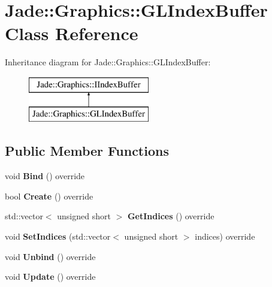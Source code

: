 \hypertarget{class_jade_1_1_graphics_1_1_g_l_index_buffer}{}\section{Jade\+:\+:Graphics\+:\+:G\+L\+Index\+Buffer Class Reference}
\label{class_jade_1_1_graphics_1_1_g_l_index_buffer}
Inheritance diagram for Jade\+:\+:Graphics\+:\+:G\+L\+Index\+Buffer\+:\begin{figure}[H]
\begin{center}
\leavevmode
\includegraphics[height=2.000000cm]{class_jade_1_1_graphics_1_1_g_l_index_buffer}
\end{center}
\end{figure}
\subsection*{Public Member Functions}
\begin{DoxyCompactItemize}
\item 
\hypertarget{class_jade_1_1_graphics_1_1_g_l_index_buffer_ab16051fed0eb89e9ea11920fa0afe8e6}{}void {\bfseries Bind} () override\label{class_jade_1_1_graphics_1_1_g_l_index_buffer_ab16051fed0eb89e9ea11920fa0afe8e6}

\item 
\hypertarget{class_jade_1_1_graphics_1_1_g_l_index_buffer_aeba772fbd44fb45ccb1c8309fc594e94}{}bool {\bfseries Create} () override\label{class_jade_1_1_graphics_1_1_g_l_index_buffer_aeba772fbd44fb45ccb1c8309fc594e94}

\item 
\hypertarget{class_jade_1_1_graphics_1_1_g_l_index_buffer_ab16200869fc966f0d58aa371fc7a2691}{}std\+::vector$<$ unsigned short $>$ {\bfseries Get\+Indices} () override\label{class_jade_1_1_graphics_1_1_g_l_index_buffer_ab16200869fc966f0d58aa371fc7a2691}

\item 
\hypertarget{class_jade_1_1_graphics_1_1_g_l_index_buffer_a94e4ec9e801db01f37bc081982979f1b}{}void {\bfseries Set\+Indices} (std\+::vector$<$ unsigned short $>$ indices) override\label{class_jade_1_1_graphics_1_1_g_l_index_buffer_a94e4ec9e801db01f37bc081982979f1b}

\item 
\hypertarget{class_jade_1_1_graphics_1_1_g_l_index_buffer_aa1638d1d10ee424c6e8b84ea7be01123}{}void {\bfseries Unbind} () override\label{class_jade_1_1_graphics_1_1_g_l_index_buffer_aa1638d1d10ee424c6e8b84ea7be01123}

\item 
\hypertarget{class_jade_1_1_graphics_1_1_g_l_index_buffer_a2b6048e0c888ac9465a7d3d7685bc22f}{}void {\bfseries Update} () override\label{class_jade_1_1_graphics_1_1_g_l_index_buffer_a2b6048e0c888ac9465a7d3d7685bc22f}

\end{DoxyCompactItemize}


